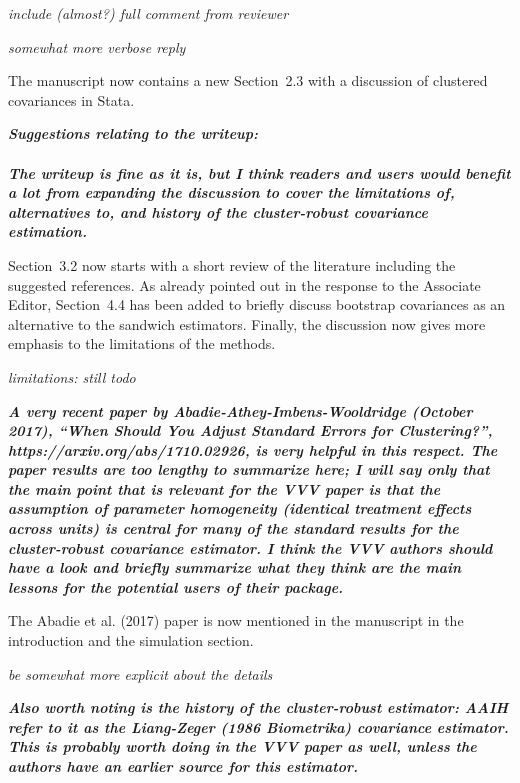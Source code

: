 \documentclass[10pt,a4paper]{article}
\begin{document}
\medskip

\emph{include (almost?) full comment from reviewer}

\emph{somewhat more verbose reply}

The manuscript now contains a new Section~2.3 with a discussion of clustered covariances in Stata.

\medskip

\textbf{\textit{Suggestions relating to the writeup:
\\ \\
The writeup is fine as it is, but I think readers and users would benefit a lot from expanding the discussion to cover the limitations of, alternatives to, and history of the cluster-robust covariance estimation.
}}

\medskip

Section~3.2 now starts with a short review of the literature including the suggested references.
As already pointed out in the response to the Associate Editor, Section~4.4 has been added to
briefly discuss bootstrap covariances as an alternative to the sandwich estimators. Finally,
the discussion now gives more emphasis to the limitations of the methods.

\emph{limitations: still todo}

\medskip

\textbf{\textit{
A very recent paper by Abadie-Athey-Imbens-Wooldridge (October 2017), ``When Should You Adjust Standard Errors for Clustering?'', https://arxiv.org/abs/1710.02926, is very helpful in this respect.  The paper results are too lengthy to summarize here; I will say only that the main point that is relevant for the VVV paper is that the assumption of parameter homogeneity (identical treatment effects across units) is central for many of the standard results for the cluster-robust covariance estimator.  I think the VVV authors should have a look and briefly summarize what they think are the main lessons for the potential users of their package.
}}

\medskip

The Abadie et al. (2017) paper is now mentioned in the manuscript in the introduction and the simulation section.

\emph{be somewhat more explicit about the details}

\medskip

\textbf{\textit{
Also worth noting is the history of the cluster-robust estimator: AAIH refer to it as the Liang-Zeger (1986 Biometrika) covariance estimator.  This is probably worth doing in the VVV paper as well, unless the authors have an earlier source for this estimator.
}}
\end{document}
